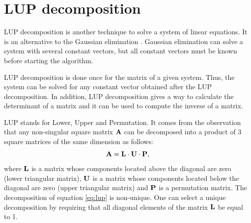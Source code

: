 \documentclass[twoside]{book}
\begin{document}
\section{LUP decomposition}
\label{sec:lup} LUP decomposition is another technique to solve a
system of linear equations. It is an alternative to the Gaussian
elimination \cite{CorLeiRiv}. Gaussian elimination can solve a
system with several constant vectors, but all constant vectors
must be known before starting the algorithm.

LUP decomposition is done once for the matrix of a given system.
Thus, the system can be solved for any constant vector obtained
after the LUP decomposition. In addition, LUP decomposition gives
a way to calculate the determinant of a matrix and it can be used
to compute the inverse of a matrix.

LUP stands for Lower, Upper and Permutation. It comes from the
observation that any non-singular square matrix ${\bf A}$ can be
decomposed into a product of 3 square matrices of the same
dimension as follows:
\begin{equation}
\label{eq:lup}
  {\bf A}={\bf L}\cdot{\bf U}\cdot{\bf P},
\end{equation}
where ${\bf L}$ is a matrix whose components located above the
diagonal are zero (lower triangular matrix), ${\bf U}$ is a matrix
whose components located below the diagonal are zero (upper
triangular matrix) and ${\bf P}$ is a permutation matrix. The
decomposition of equation \ref{eq:lup} is non-unique. One can
select a unique decomposition by requiring that all diagonal
elements of the matrix ${\bf L}$ be equal to 1.
\end{document}
